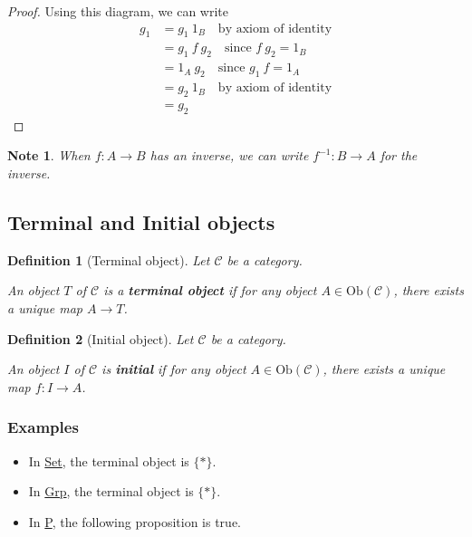 \documentclass{article}
\newtheorem{definition}{Definition}[section]
\newtheorem{note}{Note}[section]
\begin{document}
\begin{proof}
        Using this diagram, we can write
        \[
            \begin{align}
                g_1 &= g_1 \ 1_B \quad \text{by axiom of identity} \\
                &= g_1 \ f \  g_2  \quad \text{since } f \ g_2 = 1_B \\
                &= 1_A \ g_2 \quad \text{since } g_1 \ f = 1_A \\
                &= g_2 \ 1_B \quad \text{by axiom of identity} \\
                &= g_2
            \end{align}
        \]
    \end{proof}

    \begin{note}
        When $f: A \to B$ has an inverse, we can write $f^{-1}: B \to A$ for the inverse.
    \end{note}

    \subsection{Terminal and Initial objects}

    \begin{definition}[Terminal object]
        Let $\mathcal{C}$ be a category.

        An object $T$ of $\mathcal{C}$ is a \textbf{terminal object} if for any object $A \in \text{Ob}(\mathcal{C})$, there exists a unique map $A \to T$.
    \end{definition}

    \begin{definition}[Initial object]
        Let $\mathcal{C}$ be a category.

        An object $I$ of $\mathcal{C}$ is \textbf{initial} if for any object $A \in \text{Ob}(\mathcal{C})$, there exists a unique map $f: I \to A$.
    \end{definition}

    \subsubsection{Examples}
    \begin{itemize}
        \item In \underline{Set}, the terminal object is $\{*\}$.
        \item In \underline{Grp}, the terminal object is $\{*\}$.
        \item In \underline{P}, the following proposition is true.
    \end{itemize}
\end{document}
